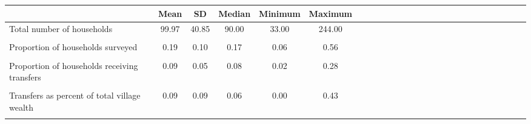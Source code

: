 {
\def\sym#1{\ifmmode^{#1}\else\(^{#1}\)\fi}
\begin{tabular}{l*{5}{ccccc}}
\toprule
          &\multicolumn{1}{c}{Mean}&\multicolumn{1}{c}{SD}&\multicolumn{1}{c}{Median}&\multicolumn{1}{c}{Minimum}&\multicolumn{1}{c}{Maximum}\\
\midrule
Total number of households&    99.97&    40.85&    90.00&    33.00&   244.00\\
          &         &         &         &         &         \\
Proportion of households surveyed&     0.19&     0.10&     0.17&     0.06&     0.56\\
          &         &         &         &         &         \\
Proportion of households receiving transfers&     0.09&     0.05&     0.08&     0.02&     0.28\\
          &         &         &         &         &         \\
Transfers as percent of total village wealth&     0.09&     0.09&     0.06&     0.00&     0.43\\
          &         &         &         &         &         \\
\bottomrule
\end{tabular}
}
